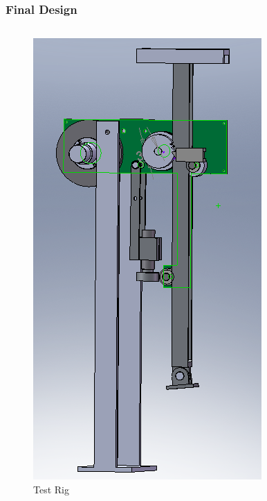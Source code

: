 \begin{frame}
\frametitle{Final Design}
\begin{columns}

\begin{figure}
\centering
\includegraphics[scale=0.4]{fig/hopper_iso.png}
\caption{Test Rig}
\end{figure}


\end{columns}
\end{frame}
